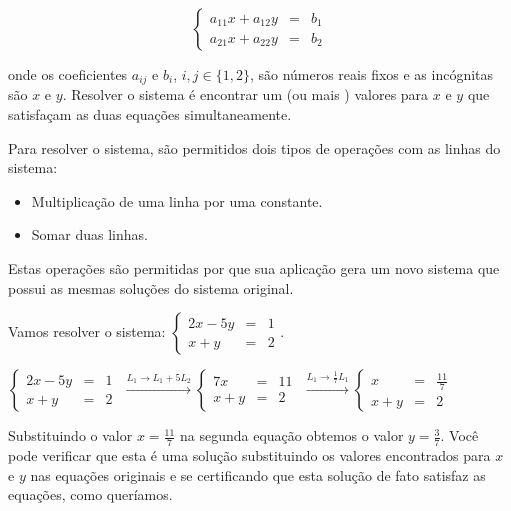 $$\left\{ \begin{array}{rcl}
a_{11}x+a_{12}y&=&b_1\\
a_{21}x+a_{22}y&=&b_2
\end{array}\right.$$

onde os coeficientes $a_{ij}$ e $b_{i}$, $i,j\in \{1,2\}$, são números reais fixos e as incógnitas são $x$ e $y$. Resolver o sistema é encontrar
um (ou mais ) valores para $x$ e $y$ que satisfaçam as duas equações simultaneamente.

Para resolver o sistema, são permitidos dois tipos de operações com as linhas do sistema:

\begin{itemize}
\item Multiplicação de uma linha por uma constante.
\item Somar duas linhas.
\end{itemize}

Estas operações são permitidas por que sua aplicação gera um novo sistema que possui as mesmas soluções do sistema original.

\begin{ex}Vamos resolver o sistema: $\left\{ \begin{array}{rcl}
2x-5y&=&1\\
x+y&=&2
\end{array}\right. .$

\vspace{0.5cm}

\noindent$\left\{ \begin{array}{rcl}
2x-5y&=&1\\
x+y&=&2
\end{array}\right.$ $\xrightarrow[]{L_1\rightarrow L_1+5L_2}\left\{ \begin{array}{rcl}
7x&=&11\\
x+y&=&2
\end{array}\right.$
$\xrightarrow[]{L_1\rightarrow\frac{1}{7}L_1}\left\{ \begin{array}{rcl}
x&=&\frac{11}{7}\\
x+y&=&2
\end{array}\right.$
\end{ex}

\noindent Substituindo o valor $x=\frac{11}{7}$ na segunda equação obtemos o valor $y=\frac{3}{7}$. Você pode verificar que esta é uma solução
substituindo os valores encontrados para $x$ e $y$ nas equações originais e se certificando que esta solução de fato satisfaz as equações,
como queríamos.

